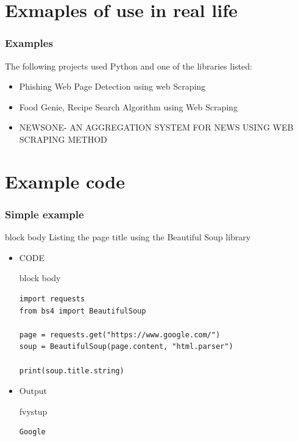 \documentclass{beamer}
\newcommand{\ssection}[1]{
	\section{#1}
	\begin{frame}[fragile=singleslide]\frametitle{}
	\Huge #1
	\end{frame}
}
\newenvironment{program}{\begin{beamercolorbox}[rounded=true,shadow=true]{block body}\vspace{-4mm}}{\vspace{-2mm}\end{beamercolorbox}}
\newenvironment{vystup}{\begin{beamercolorbox}[rounded=true,shadow=true]{fvystup}}{\end{beamercolorbox}}
\newenvironment{poznamka}{\begin{beamercolorbox}[rounded=true,shadow=false]{block body}}{\end{beamercolorbox}}
\begin{document}
\section{Exmaples of use in real life}

\begin{frame}[fragile=singleslide]\frametitle{Examples}
The following projects used Python and one of the libraries listed: 
\begin{itemize}
\item Phishing Web Page Detection using web Scraping
\item Food Genie, Recipe Search Algorithm using Web Scraping
\item NEWSONE- AN AGGREGATION SYSTEM FOR NEWS USING WEB SCRAPING METHOD
\end{itemize}
\end{frame}


\section{Example code}
\begin{frame}[fragile=singleslide]\frametitle{Simple example}
\begin{poznamka}
Listing the page title using the Beautiful Soup library
\end{poznamka}

\begin{itemize}
\item CODE

\begin{program}
\begin{lstlisting}
import requests
from bs4 import BeautifulSoup

page = requests.get("https://www.google.com/")
soup = BeautifulSoup(page.content, "html.parser")

print(soup.title.string)
\end{lstlisting}
\end{program}

\item Output
\begin{vystup}
\begin{lstlisting}
Google
\end{lstlisting}
\end{vystup}

\end{itemize}
\end{frame}
\end{document}
